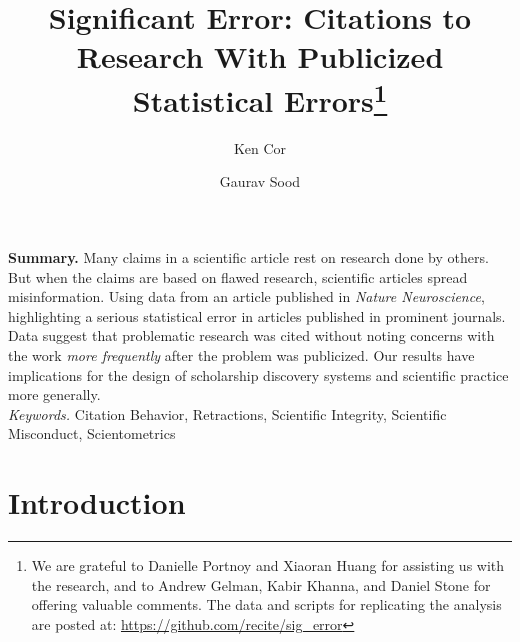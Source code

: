\documentclass[12pt, letterpaper]{article}
\begin{document}
\title{\Large{Significant Error: Citations to Research With Publicized Statistical Errors}\footnote{We are grateful to Danielle Portnoy and Xiaoran Huang for assisting us with the research, and to Andrew Gelman, Kabir Khanna, and Daniel Stone for offering valuable comments. The data and scripts for replicating the analysis are posted at: \href{https://github.com/recite/sig_error}{https://github.com/recite/sig\_error}}\\\vspace{5mm}}

\author{Ken Cor\\
\and Gaurav Sood}
\maketitle

\vspace{.2cm}
\doublespacing
\clearpage
\textbf{Summary.} Many claims in a scientific article rest on research done by others. But when the claims are based on flawed research, scientific articles spread misinformation. Using data from an article published in \textit{Nature Neuroscience}, highlighting a serious statistical error in articles published in prominent journals. Data suggest that problematic research was cited without noting concerns with the work \textit{more frequently} after the problem was publicized. Our results have implications for the design of scholarship discovery systems and scientific practice more generally.
\vspace{.2cm}\\
\singlespacing
\textit{Keywords.} Citation Behavior, Retractions, Scientific Integrity, Scientific Misconduct, Scientometrics
\doublespacing
\clearpage

\section{Introduction}
\end{document}
